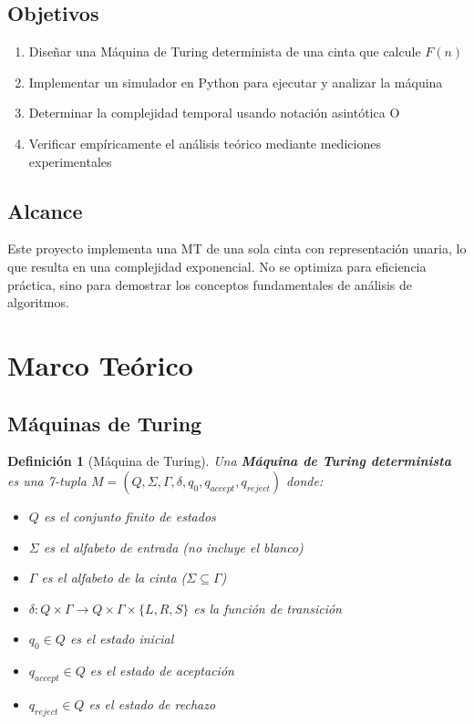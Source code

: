 \documentclass[12pt,a4paper]{article}
\newtheorem{definicion}{Definición}
\begin{document}
\subsection{Objetivos}

\begin{enumerate}
    \item Diseñar una Máquina de Turing determinista de una cinta que calcule $F(n)$
    \item Implementar un simulador en Python para ejecutar y analizar la máquina
    \item Determinar la complejidad temporal usando notación asintótica O
    \item Verificar empíricamente el análisis teórico mediante mediciones experimentales
\end{enumerate}

\subsection{Alcance}

Este proyecto implementa una MT de una sola cinta con representación unaria, lo que resulta en una complejidad exponencial. No se optimiza para eficiencia práctica, sino para demostrar los conceptos fundamentales de análisis de algoritmos.

\newpage

\section{Marco Teórico}

\subsection{Máquinas de Turing}

\begin{definicion}[Máquina de Turing]
Una \textbf{Máquina de Turing determinista} es una 7-tupla $M = (Q, \Sigma, \Gamma, \delta, q_0, q_{accept}, q_{reject})$ donde:
\begin{itemize}
    \item $Q$ es el conjunto finito de estados
    \item $\Sigma$ es el alfabeto de entrada (no incluye el blanco)
    \item $\Gamma$ es el alfabeto de la cinta ($\Sigma \subseteq \Gamma$)
    \item $\delta: Q \times \Gamma \rightarrow Q \times \Gamma \times \{L, R, S\}$ es la función de transición
    \item $q_0 \in Q$ es el estado inicial
    \item $q_{accept} \in Q$ es el estado de aceptación
    \item $q_{reject} \in Q$ es el estado de rechazo
\end{itemize}
\end{definicion}
\end{document}
